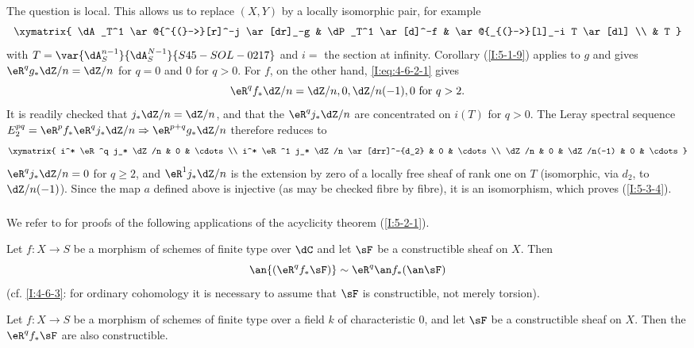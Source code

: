 The question is local. This allows us to replace $(X,Y)$ by a locally
isomorphic pair, for example
\[\xymatrix{
  \dA_T^1 \ar@{^{(}->}[r]^-j \ar[dr]_-g
    & \dP_T^1 \ar[d]^-f
    & \ar@{_{(}->}[l]_-i T \ar[dl] \\
  & T
}\]
with $T=\var{\dA_S^{n-1}}{\dA_S^{N-1}}{S45-SOL-0217}$ and $i=$ the section at infinity. Corollary
(\ref{I:5-1-9}) applies to $g$ and gives
$\eR^qg_*\dZ/n=\dZ/n$ for $q=0$ and $0$ for $q>0$. For $f$, on the
other hand, \eqref{I:eq:4-6-2-1} gives
\[
  \eR^q f_* \dZ/n = \dZ/n,0,\dZ/n(-1),0 \text{ for $q>2$.}
\]
It is readily checked that $j_*\dZ/n=\dZ/n$, and that the
$\eR^qj_*\dZ/n$ are concentrated on $i(T)$ for $q>0$. The Leray
spectral sequence
$E_2^{pq}=\eR^pf_*\eR^qj_*\dZ/n\Rightarrow\eR^{p+q}g_*\dZ/n$ therefore
reduces to
\[\xymatrix{
  i^* \eR^q j_* \dZ/n & 0 & \cdots \\
  i^* \eR^1 j_* \dZ/n \ar[drr]^-{d_2} & 0 & \cdots \\
  \dZ/n              & 0 & \dZ/n(-1) & 0 & \cdots
}\]
$\eR^qj_*\dZ/n=0$ for $q\geqslant2$, and $\eR^1j_*\dZ/n$ is the
extension by zero of a locally free sheaf of rank one on $T$ (isomorphic,
via $d_2$, to $\dZ/n(-1)$). Since the map $a$ defined above is injective
(as may be checked fibre by fibre), it is an isomorphism, which proves
(\ref{I:5-3-4}).

\subsubsection{}\label{I:5-3-5}

We refer to \cite[XVI.4,5]{sga4} for proofs of the following applications
of the acyclicity theorem (\ref{I:5-2-1}).

\begin{theorem}\label{I:5-3-6} %
Let $f:X\to S$ be a morphism of schemes of finite type over $\dC$ and
let $\sF$ be a constructible sheaf on $X$. Then
\[
  \an{(\eR^q f_*\sF)} \sim \eR^q \an f_* (\an\sF)
\]
(cf. \ref{I:4-6-3}: for ordinary cohomology it is necessary to assume
that $\sF$ is constructible, not merely torsion).
\end{theorem}

\begin{theorem}\label{I:5-3-7} %
Let $f:X\to S$ be a morphism of schemes of finite type over a field $k$
of characteristic $0$, and let $\sF$ be a constructible sheaf on $X$.
Then the $\eR^qf_*\sF$ are also constructible.
\end{theorem}

